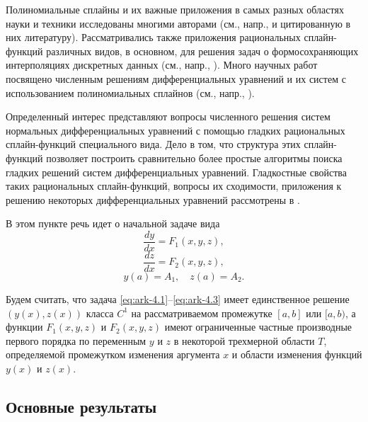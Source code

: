 Полиномиальные сплайны и их важные приложения в самых разных областях науки и
техники исследованы многими авторами (см., напр., \cite{bib:ark-14,bib:ark-15,bib:ark-16} и цитированную в них
литературу).
Рассматривались также приложения рациональных сплайн-функций различных видов,
в основном, для решения задач о формосохраняющих интерполяциях дискретных данных
(см., напр., \cite{bib:ark-16,bib:ark-17,bib:ark-18}).
Много научных работ посвящено численным решениям дифференциальных уравнений и
их систем с использованием полиномиальных сплайнов (см., напр., \cite{bib:ark-14,bib:ark-15,bib:ark-16}).

Определенный интерес представляют вопросы численного решения систем нормальных
дифференциальных уравнений с помощью гладких рациональных сплайн-функций специального
вида. Дело в том, что структура этих сплайн-функций позволяет построить сравнительно
более простые алгоритмы поиска гладких решений систем дифференциальных уравнений.
Гладкостные свойства таких рациональных сплайн-функций, вопросы их сходимости,
приложения к решению некоторых
дифференциальных уравнений рассмотрены в \cite{bib:ark-11,bib:ark-12,bib:ark-13}.

В этом пункте речь идет о начальной задаче вида
\begin{equation}\label{eq:ark-4.1}
\frac{dy}{dx}=F_1(x,y,z),
\end{equation}
\begin{equation}\label{eq:ark-4.2}
\frac{dz}{dx}=F_2(x,y,z),
\end{equation}
\begin{equation}\label{eq:ark-4.3}
y(a)=A_1,\quad z(a)=A_2.
\end{equation}

Будем считать, что задача \eqref{eq:ark-4.1}--\eqref{eq:ark-4.3} имеет единственное решение
$(y(x), z(x))$ класса $C^1$ на рассматриваемом промежутке $[a,b]$ или
$[a,b)$, а функции $F_1(x,y,z)$ и $F_2(x,y,z)$ имеют ограниченные частные
 производные первого порядка по переменным $y$ и $z$ в некоторой трехмерной
области $T$, определяемой промежутком изменения аргумента $x$ и области
изменения функций $y(x)$ и $z(x)$.

\subsection{Основные результаты}

